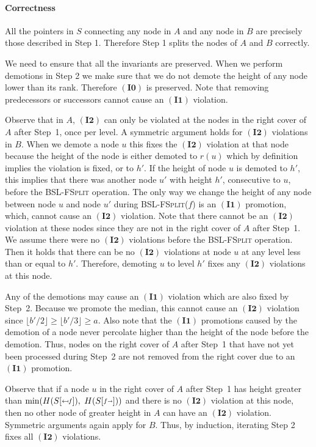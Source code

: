 \documentclass[11pt]{article}
\newcommand{\Bslfspl}{\mbox{\textsc{BSL-FSplit}}}
\newcommand{\Bslfsplx}[1]{\mbox{\textsc{BSL-FSplit(\ensuremath{#1})}}}
\newcommand{\invzero}{\ensuremath{\mathbf{(I0)}}}
\newcommand{\invone}{\ensuremath{\mathbf{(I1)}}}
\newcommand{\invtwo}{\ensuremath{\mathbf{(I2)}}}
\newcommand{\prevheight}{\ensuremath{h'}}
\newcommand{\intheight}[1]{\ensuremath{H(#1)}}
\newcommand{\noderank}[1]{\ensuremath{r(\node #1)}}
\newcommand{\node}[1]{\ensuremath{#1}}
\newcommand{\prebsltempl}[4]{\ensuremath{#1{[\raisebox{#4}{$#3\mapsfrom\hspace{-0.0mm}#2$}]}}}
\newcommand{\prebsl}[2]{\ensuremath{\prebsltempl{#1}{#2}{\scriptstyle}{0.3mm}}}
\newcommand{\postbsltempl}[4]{\ensuremath{#1{[\raisebox{#4}{$#3#2\shortrightarrow\hspace{-0.0mm}$}]}}}
\newcommand{\postbsl}[2]{\ensuremath{\postbsltempl{#1}{#2}{\scriptstyle}{0.3mm}}}
\newcommand{\bsl}[1]{\ensuremath{#1}}
\begin{document}
\paragraph{Correctness} All the pointers in \bsl S connecting any node in \bsl A and any node in \bsl B are precisely those described in Step 1. Therefore Step 1 splits the nodes of $\bsl A$ and $\bsl B$ correctly. 

We need to ensure that all the invariants are preserved. When we perform demotions in Step 2 we make sure that we do not demote the height of any node lower than its rank. Therefore \invzero{} is preserved. Note that removing predecessors or successors cannot cause an \invone{} violation. 

Observe that in $\bsl A$, \invtwo{} can only be violated at the nodes in the right cover of \bsl A after Step~1, once per level. A symmetric argument holds for \invtwo{} violations in \bsl B. 
When we demote a node \node u this fixes the \invtwo{} violation at that node because the height of the node is either demoted to \noderank u which by definition implies the violation is fixed, or to \prevheight{}. 
If the height of node \node u is demoted to \prevheight{}, this implies that there was another node \node{u'} with height \prevheight{}, consecutive to \node u, before the \Bslfspl{} operation. 
The only way we change the height of any node between node \node u and node \node{u'} during \Bslfsplx{f} is an \invone{} promotion, which, cannot cause an \invtwo{} violation. Note that there cannot be an \invtwo{} violation at these nodes since they are not in the right cover of \bsl A after Step~1. We assume there were no \invtwo{} violations before the \Bslfspl{} operation. Then it holds that there can be no \invtwo{} violations at node \node u at any level less than or equal to \prevheight{}. Therefore, demoting \node u to level \prevheight{} fixes any \invtwo{} violations at this node. 

Any of the demotions may cause an \invone{} violation which are also fixed by Step~2. Because we promote the median, this cannot cause an \invtwo{} violation since $\lfloor b'/2\rfloor \geq \lfloor b'/3\rfloor \geq a$. Also note that the \invone{} promotions caused by the demotion of a node never percolate higher than the height of the node before the demotion. Thus, nodes on the right cover of \bsl A after Step~1 that have not yet been processed during Step~2 are not removed from the right cover due to an \invone{} promotion. 

Observe that if a node \node u in the right cover of \bsl A after Step~1 has height greater than $\min(\intheight{\prebsl{S}{f}},$ $\intheight{\postbsl{S}{f}})$ and there is no \invtwo{} violation at this node, then no other node of greater height in \bsl A can have an \invtwo{} violation. Symmetric arguments again apply for \bsl B. Thus, by induction, iterating Step 2 fixes all \invtwo{} violations. 
\end{document}
